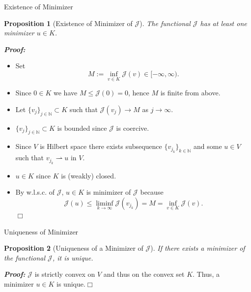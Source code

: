 \documentclass[10pt,aspectratio=169]{beamer}
\newtheorem{proposition}{Proposition}[section]
\def\N{{\mathbb N}}
\def\cJ{{\mathcal J}}
\def\eop{\hfill{$\Box$}}
\begin{document}
\begin{frame}{Existence of Minimizer}
	\begin{proposition}[Existence of Minimizer of $\cJ$]
		The functional $\cJ$ has at least one minimizer $u\in K$.
	\end{proposition}
	\textbf{\em Proof:}
	\begin{itemize}
		\item Set
		      \begin{equation*}
			      M := \inf_{v\in K}\cJ(v)\in[-\infty,\infty).
		      \end{equation*}
		\item Since $0\in K$ we have $M\le \cJ(0)=0$, hence $M$ is finite from above.
		\item Let $\{v_j\}_{j\in\N}\subset K$ such that $\cJ(v_j)\to M$ as $j\to\infty$.
		\item $\{v_j\}_{j\in\N}\subset K$ is bounded since $\cJ$ is coercive.
		\item Since $V$ is Hilbert space there exists subsequence $\{v_{j_k}\}_{k\in\N}$ and some $u\in V$ such that $v_{j_k} \rightharpoonup u$ in $V$.
		\item $u\in K$ since $K$ is (weakly) closed.
		\item By w.l.s.c. of $\cJ$, $u\in K$ is minimizer of $\cJ$ because
		      \begin{equation*}
			      \cJ(u)\le \liminf_{k\to\infty}\cJ(v_{j_k})=M=\inf_{v\in K}\cJ(v).
		      \end{equation*}\eop
	\end{itemize}
\end{frame}
\begin{frame}{Uniqueness of Minimizer}
	\begin{proposition}[Uniqueness of a Minimizer of $\cJ$]
		If there exists a minimizer of the functional $\cJ$, it is unique.
	\end{proposition}
	\textbf{\em Proof: } $\cJ$ is strictly convex on $V$ and thus on the convex set $K$. Thus, a minimizer $u\in K$ is unique.\eop
\end{frame}
\end{document}
